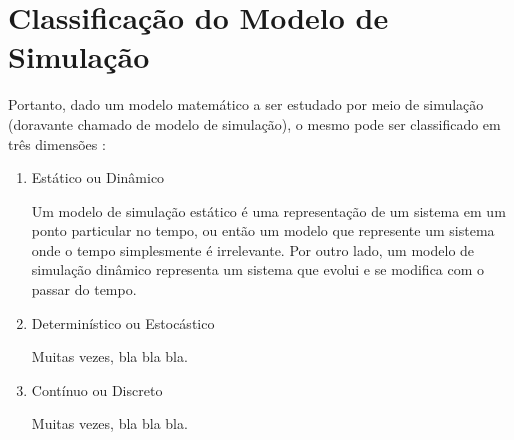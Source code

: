 \section{Classificação do Modelo de Simulação}

Portanto, dado um modelo matemático a ser estudado por meio de simulação
(doravante chamado de modelo de simulação), o mesmo pode ser classificado em
três dimensões \cite{Banks,Law}:

\begin{enumerate}
\item Estático ou Dinâmico

Um modelo de simulação estático é uma representação de um sistema em um ponto
particular no tempo, ou então um modelo que represente um sistema onde o tempo
simplesmente é irrelevante. Por outro lado, um modelo de simulação dinâmico
representa um sistema que evolui e se modifica com o passar do tempo.

\item Determinístico ou Estocástico

Muitas vezes, bla bla bla.

\item Contínuo ou Discreto

Muitas vezes, bla bla bla.

\end{enumerate}